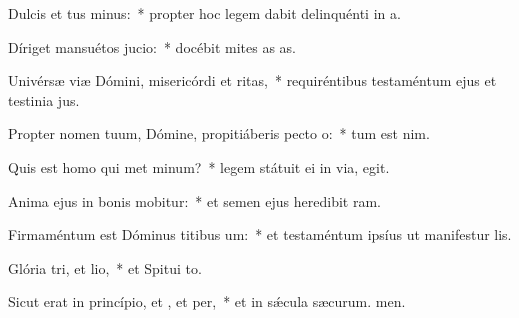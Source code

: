 \item Dulcis et tus minus:~* propter hoc legem dabit delinquénti in a.
\item Díriget mansuétos  jucio:~* docébit mites as as.
\item Univérsæ viæ Dómini, misericórdi et ritas,~* requiréntibus testaméntum ejus et testinia jus.
\item Propter nomen tuum, Dómine, propitiáberis pecto o:~* tum est nim.
\item Quis est homo qui met minum?~* legem státuit ei in via,  egit.
\item Anima ejus in bonis mobitur:~* et semen ejus heredibit ram.
\item Firmaméntum est Dóminus titibus um:~* et testaméntum ipsíus ut manifestur lis.
\item Glória tri, et lio,~* et Spitui to.
\item Sicut erat in princípio, et , et per,~* et in sǽcula sæcurum. men.
